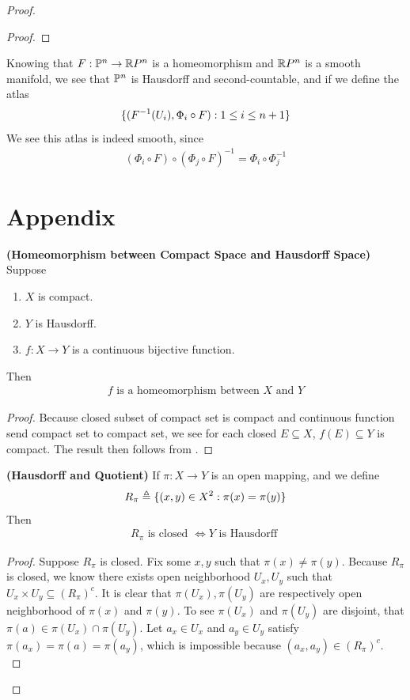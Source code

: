 \documentclass{report}
\begin{document}
\begin{proof}
\begin{proof}
\end{proof}
\begin{mdframed}
Knowing that $F:\P^n\rightarrow \RP^n$ is a homeomorphism and $\RP^n$ is a smooth manifold, we see that  $\P^n$ is Hausdorff and second-countable, and if we define the atlas 
\begin{align*}
  \set{(F^{-1}(U_i), \Phi_i \circ F):1\leq i\leq n+1}
\end{align*}
We see this atlas is indeed smooth, since 
\begin{align*}
  (\Phi_i\circ F)\circ (\Phi_j \circ F)^{-1}=\Phi_i \circ \Phi_j^{-1}
\end{align*}
\end{mdframed}

\section{Appendix}
\begin{theorem}
\label{HbC}
\textbf{(Homeomorphism between Compact Space and Hausdorff Space)} Suppose 
\begin{enumerate}[label=(\alph*)]
  \item $X$ is compact.  
  \item $Y$ is Hausdorff.  
  \item $f:X\rightarrow Y$ is a continuous bijective function. 
\end{enumerate}
Then 
\begin{align*}
f\text{ is a homeomorphism between }X\text{ and }Y
\end{align*}
\end{theorem}
\begin{proof}
Because closed subset of compact set is compact and continuous function send compact set to compact set, we see for each closed $E\subseteq X$, $f(E)\subseteq Y$ is compact. The result then follows from . 
\end{proof}
\begin{theorem}
\label{Hausdorff and Quotient}
  \textbf{(Hausdorff and Quotient)} If $\pi:X\rightarrow Y$ is an open mapping, and we define
\begin{align*}
R_\pi\triangleq \set{(x,y)\in X^2 : \pi (x)=\pi (y)} 
\end{align*}
Then
\begin{align*}
R_\pi\text{ is closed }\iff Y\text{ is Hausdorff }
\end{align*}
\end{theorem}
\begin{proof}
  Suppose $R_\pi$ is closed. Fix some $x,y$ such that $\pi (x)\neq \pi (y)$. Because $R_\pi$ is closed, we know there exists open neighborhood $U_x,U_y$ such that $U_x \times U_y \subseteq (R_\pi)^c$. It is clear that $\pi (U_x),\pi (U_y)$ are respectively open neighborhood of $\pi (x)$ and $\pi (y)$. To see $\pi (U_x)$ and $\pi (U_y)$ are disjoint,  that $\pi (a)\in \pi (U_x)\cap \pi (U_y)$. Let $a_x\in U_x$ and $a_y\in U_y$ satisfy $\pi (a_x)=\pi (a)=\pi (a_y)$, which is impossible because $(a_x,a_y)\in (R_\pi)^c$. \CaC\\



\end{proof}
\end{proof}
\end{document}
